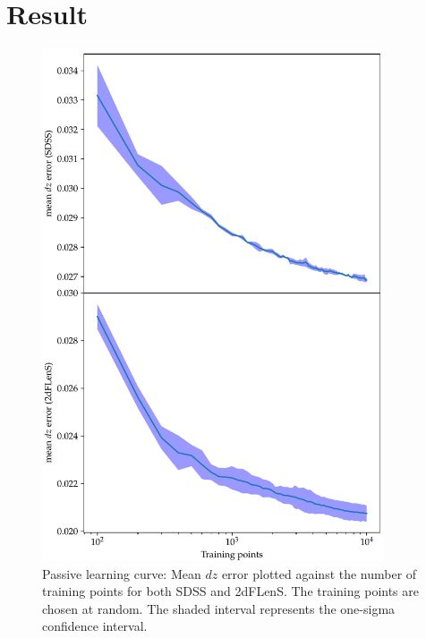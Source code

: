 \documentclass[11pt,twoside,openright]{report}
\begin{document}
\section{Result}
\begin{figure}
    \centering
    \includegraphics[width=0.9\textwidth]{passive_dz.pdf}
    \caption{Passive learning curve: Mean $dz$ error plotted against the number of training points for both SDSS and 2dFLenS. The training points are chosen at random. The shaded interval represents the one-sigma confidence interval.}
    \label{fig:passive_dz}
  \end{figure}
\end{document}
